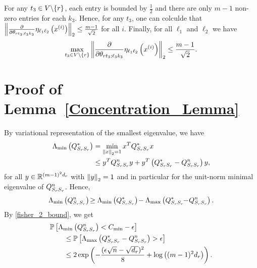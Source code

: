 For any $t_3\in V\backslash\{r\}$, each entry is bounded by $\frac{1}{2}$ and there are only $m-1$ non-zero entries for each $k_3$. Hence, for any $t_3$, one can colculde that $\left\|\frac{\partial}{\partial\theta_{r t_3;\ell_3k_3}}\eta_{\ell_1\ell_2}\left(x^{(i)}\right)\right\|_{2}\leq\frac{m-1}{\sqrt{2}}$ for all $i$. Finally, for all $\ell_1$ and $\ell_2$ we have
\begin{equation}
\max_{t_3\in V\backslash\{r\}} \left\|\frac{\partial}{\partial\theta_{r t_3;\ell_3k_3}}\eta_{\ell_1\ell_2}\left(x^{(i)}\right)\right\|_{2}\leq\frac{m-1}{\sqrt{2}}.
\label{derivative_hessian_eq}
\end{equation}


\section{Proof of Lemma~\ref{Concentration_Lemma}}
 By variational representation of the smallest eigenvalue, we have
\begin{equation}
\begin{aligned}
\Lambda_{\min}\left(Q^*_{S_{r}S_{r}}\right) &= \min_{\left\|x\right\|_{2}=1}x^TQ^*_{S_{r}S_{r}}x\\
&\leq y^TQ^n_{S_{r}S_{r}}y + y^T\left(Q^*_{S_{r}S_{r}}-Q^n_{S_{r}S_{r}}\right)y,
\end{aligned}
\nonumber
\end{equation}
for all $y\in\mathbb{R}^{(m-1)^2d_{r}}$ with $\left\|y\right\|_{2}=1$ and in particular for the unit-norm minimal eigenvalue of $Q^n_{S_{r}S_{r}}$. Hence,
\begin{equation}
\Lambda_{\min}\left(Q^n_{S_{r}S_{r}}\right) \!\geq\Lambda_{\min}\left(Q^*_{S_{r}S_{r}}\right) \!-\Lambda_{\max}\left(Q^*_{S_{r}S_{r}}\!\!-\!Q^n_{S_{r}S_{r}}\right).
\nonumber
\end{equation}
By \eqref{fisher_2_bound}, we get
\begin{equation}
\begin{aligned}
&\mathbb{P}\left[\Lambda_{\min}\left(Q^n_{S_{r}S_{r}}\right)< C_{\min}-\epsilon\right]\\ &\qquad\leq\mathbb{P}\left[\Lambda_{\max}\left(Q^*_{S_{r}S_{r}}-Q^n_{S_{r}S_{r}}\right) > \epsilon\right]\\ &\qquad\leq 2\exp\left(-\frac{(\epsilon\sqrt{n}-\sqrt{d_{r}})^2}{8}+\log\big((m-1)^2d_{r}\big)\right).\\
\end{aligned}
\nonumber
\end{equation}

